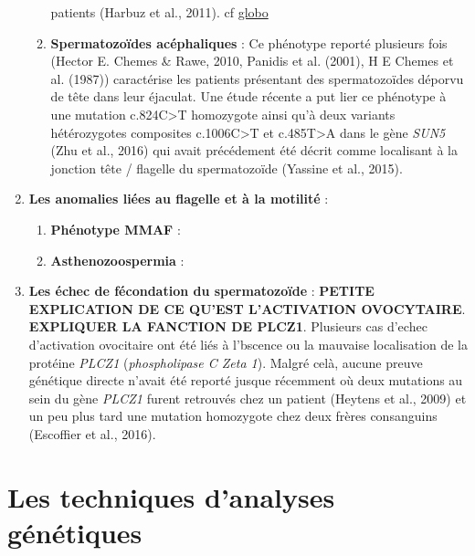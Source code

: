\documentclass[12pt,twoside]{reedthesis}
\providecommand{\tightlist}{%
  \setlength{\itemsep}{0pt}\setlength{\parskip}{0pt}}
\theoremstyle{definition}
\theoremstyle{definition}
\theoremstyle{remark}
\begin{document}
\begin{enumerate}
\begin{enumerate}
      patients (Harbuz et al., 2011). cf
      \protect\hyperlink{globo}{globo}\\
    \item
      \textbf{Spermatozoïdes acéphaliques} : Ce phénotype reporté
      plusieurs fois (Hector E. Chemes \& Rawe, 2010, Panidis et al.
      (2001), H E Chemes et al. (1987)) caractérise les patients
      présentant des spermatozoïdes déporvu de tête dans leur éjaculat.
      Une étude récente a put lier ce phénotype à une mutation
      c.824C\textgreater{}T homozygote ainsi qu'à deux variants
      hétérozygotes composites c.1006C\textgreater{}T et
      c.485T\textgreater{}A dans le gène \emph{SUN5} (Zhu et al., 2016)
      qui avait précédement été décrit comme localisant à la jonction tête
      / flagelle du spermatozoïde (Yassine et al., 2015).\\
    \end{enumerate}
  \item
    \textbf{Les anomalies liées au flagelle et à la motilité} :
  
    \begin{enumerate}
    \def\labelenumii{\alph{enumii}.}
    \tightlist
    \item
      \textbf{Phénotype MMAF} :\\
    \item
      \textbf{Asthenozoospermia} :\\
    \end{enumerate}
  \item
    \textbf{Les échec de fécondation du spermatozoïde} : \textbf{PETITE
    EXPLICATION DE CE QU'EST L'ACTIVATION OVOCYTAIRE}. \textbf{EXPLIQUER
    LA FANCTION DE PLCZ1}. Plusieurs cas d'echec d'activation ovocitaire
    ont été liés à l'bscence ou la mauvaise localisation de la protéine
    \emph{PLCZ1} (\emph{phospholipase C Zeta 1}). Malgré celà, aucune
    preuve génétique directe n'avait été reporté jusque récemment où deux
    mutations au sein du gène \emph{PLCZ1} furent retrouvés chez un
    patient (Heytens et al., 2009) et un peu plus tard une mutation
    homozygote chez deux frères consanguins (Escoffier et al., 2016).
  \end{enumerate}
  
  \newpage  
  
  \section{Les techniques d'analyses
  génétiques}\label{les-techniques-danalyses-genetiques}
  
\end{document}
